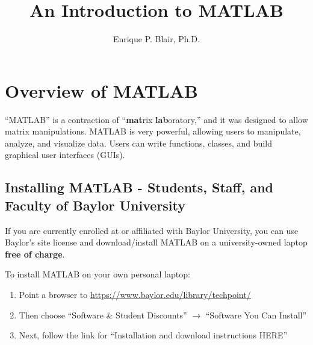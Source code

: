 \documentclass[11pt]{article}
\author{Enrique P. Blair, Ph.D.}
\title{An Introduction to MATLAB}
\theoremstyle{definition}
\newcommand{\myhref}[2]{\textcolor{blue}{\underline{\href{#1}{#2}}}}
\begin{document}

\maketitle

\tableofcontents

\clearpage

\section{Overview of MATLAB}
``MATLAB'' is a contraction of ``\textbf{mat}rix \textbf{lab}oratory,'' and it was designed to allow matrix manipulations. MATLAB is very powerful, allowing users to manipulate, analyze, and visualize data. Users can write functions, classes, and build graphical user interfaces (GUIs).

\subsection{Installing MATLAB - Students, Staff, and Faculty of Baylor University}
If you are currently enrolled at or affiliated with Baylor University, you can use Baylor's site license and download/install MATLAB on a university-owned laptop \textbf{free of charge}.

To install MATLAB on your own personal laptop:
\begin{enumerate}
\item Point a browser to \myhref{https://www.baylor.edu/library/techpoint/}{https://www.baylor.edu/library/techpoint/}
\item Then choose ``Software \& Student Discounts'' $\rightarrow$ ``Software You Can Install''
\item Next, follow the link for ``Installation and download instructions HERE''
\end{enumerate}











\end{document}
